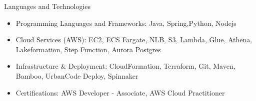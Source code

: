 \documentclass[]{mcdowellcv}
\begin{document}
    \makeheader

    \begin{cvsection}{Languages and Technologies}
        \begin{cvsubsection}{}{}{}
            \begin{itemize}
                \item Programming Languages and Frameworks: Java, Spring,Python, Nodejs
                \item Cloud Services (AWS): EC2, ECS Fargate, NLB, S3, Lambda, Glue, Athena, Lakeformation, Step Function, Aurora Postgres
                \item Infrastructure & Deployment: CloudFormation, Terraform, Git, Maven, Bamboo, UrbanCode Deploy, Spinnaker
                \item Certifications: AWS Developer - Associate, AWS Cloud Practitioner
            \end{itemize}
        \end{cvsubsection}
    \end{cvsection}
\end{document}
